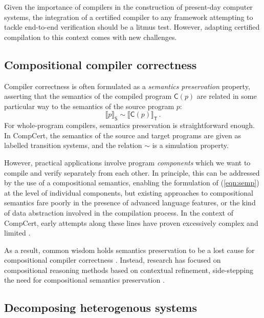 \documentclass[sigplan,10pt,review]{acmart}
\newcommand{\kw}[1]{\ensuremath{ \mathsf{#1} }}
\begin{document}
Given the importance of compilers in
the construction of present-day computer systems,
the integration of a certified compiler to any framework
attempting to tackle end-to-end verification
should be a litmus test.
However, adapting certified compilation to this context
comes with new challenges.


\subsection{Compositional compiler correctness} %

Compiler correctness is often formulated as a
\emph{semantics preservation} property,
asserting that the semantics
of the compiled program $\kw{C}(p)$
are related in some particular way
to the semantics
of the source program $p$:
\begin{equation} \label{eqn:semp}
  \llbracket p \rrbracket_\kw{S} \sim
  \llbracket \kw{C}(p) \rrbracket_\kw{T}
  \,.
\end{equation}
For whole-program compilers,
semantics preservation is straightforward enough.
In CompCert,
the semantics of the source and target programs
are given as labelled transition systems,
and the relation $\sim$ is a simulation property.

However,
practical applications involve
program \emph{components} which we want to compile
and verify separately from each other.
In principle,
this can be addressed by the use of a compositional semantics,
enabling the formulation of (\ref{eqn:semp})
at the level of individual components,
but existing approaches to compositional semantics
fare poorly in the presence of advanced language features,
or the kind of data abstraction
involved in the compilation process.
In the context of CompCert,
early attempts along these lines
have proven excessively
complex and limited \cite{cpp15,compcompcert}.

As a result,
common wisdom holds semantics preservation
to be a lost cause
for compositional compiler correctness \cite{next700}.
Instead,
research has focused on
compositional reasoning methods
based on contextual refinement,
side-stepping the need for compositional semantics preservation
\cite{sepcompcert,compcertm}.


\subsection{Decomposing heterogenous systems} %
\end{document}
